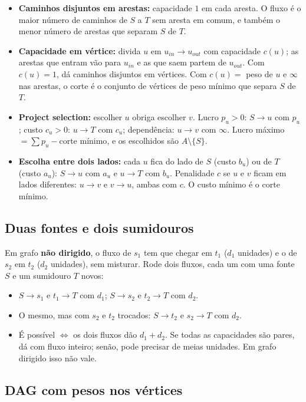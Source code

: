 \begin{itemize}
  \item \textbf{Caminhos disjuntos em arestas:} capacidade $1$ em cada aresta. O fluxo é o maior número de caminhos
        de $S$ a $T$ sem aresta em comum, e também o menor número de arestas que separam $S$ de $T$.
  \item \textbf{Capacidade em vértice:} divida $u$ em $u_{in} \to u_{out}$ com capacidade $c(u)$; as arestas que entram
        vão para $u_{in}$ e as que saem partem de $u_{out}$. Com $c(u) = 1$, dá caminhos disjuntos em vértices. Com
        $c(u) = $ peso de $u$ e $\infty$ nas arestas, o corte é o conjunto de vértices de peso mínimo que separa $S$ de $T$.
  \item \textbf{Project selection:} escolher $u$ obriga escolher $v$. Lucro $p_u > 0$: $S \to u$ com $p_u$;
        custo $c_u > 0$: $u \to T$ com $c_u$; dependência: $u \to v$ com $\infty$.
        Lucro máximo $= \sum p_u - \text{corte mínimo}$, e os escolhidos são $A \setminus \{S\}$.
  \item \textbf{Escolha entre dois lados:} cada $u$ fica do lado de $S$ (custo $b_u$) ou de $T$ (custo $a_u$):
        $S \to u$ com $a_u$ e $u \to T$ com $b_u$. Penalidade $c$ se $u$ e $v$ ficam em lados diferentes:
        $u \to v$ e $v \to u$, ambas com $c$. O custo mínimo é o corte mínimo.
\end{itemize}

\subsection*{Duas fontes e dois sumidouros}

Em grafo \textbf{não dirigido}, o fluxo de $s_1$ tem que chegar em $t_1$ ($d_1$ unidades) e o de $s_2$ em $t_2$
($d_2$ unidades), sem misturar. Rode dois fluxos, cada um com uma fonte $S$ e um sumidouro $T$ novos:
\begin{itemize}
  \item $S \to s_1$ e $t_1 \to T$ com $d_1$; $S \to s_2$ e $t_2 \to T$ com $d_2$.
  \item O mesmo, mas com $s_2$ e $t_2$ trocados: $S \to t_2$ e $s_2 \to T$ com $d_2$.
  \item É possível $\iff$ os dois fluxos dão $d_1 + d_2$. Se todas as capacidades são pares, dá com fluxo inteiro;
        senão, pode precisar de meias unidades. Em grafo dirigido isso não vale.
\end{itemize}

\subsection*{DAG com pesos nos vértices}

